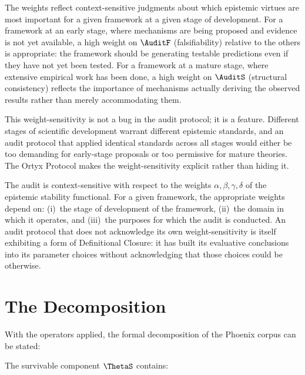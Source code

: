 The weights reflect context-sensitive judgments about
which epistemic virtues are most important for a given
framework at a given stage of development. For a framework
at an early stage, where mechanisms are being proposed
and evidence is not yet available, a high weight on
$\AuditF$ (falsifiability) relative to the others is
appropriate: the framework should be generating testable
predictions even if they have not yet been tested.
For a framework at a mature stage, where extensive
empirical work has been done, a high weight on
$\AuditS$ (structural consistency) reflects the
importance of mechanisms actually deriving the
observed results rather than merely accommodating them.

This weight-sensitivity is not a bug in the audit
protocol; it is a feature. Different stages of
scientific development warrant different epistemic
standards, and an audit protocol that applied
identical standards across all stages would either
be too demanding for early-stage proposals or too
permissive for mature theories. The Ortyx Protocol
makes the weight-sensitivity explicit rather than
hiding it.

\begin{auditprop}
\label{ap:context-sensitivity}
The \Ortyx{} audit is context-sensitive with respect
to the weights $\alpha, \beta, \gamma, \delta$ of
the epistemic stability functional. For a given
framework, the appropriate weights depend on: (i)~the
stage of development of the framework, (ii)~the
domain in which it operates, and (iii)~the purposes
for which the audit is conducted. An audit protocol
that does not acknowledge its own weight-sensitivity
is itself exhibiting a form of Definitional Closure:
it has built its evaluative conclusions into its
parameter choices without acknowledging that those
choices could be otherwise.
\end{auditprop}

\section{The Decomposition}
\label{sec:decomposition}

With the operators applied, the formal decomposition
of the Phoenix corpus can be stated:


The survivable component $\ThetaS$ contains:

